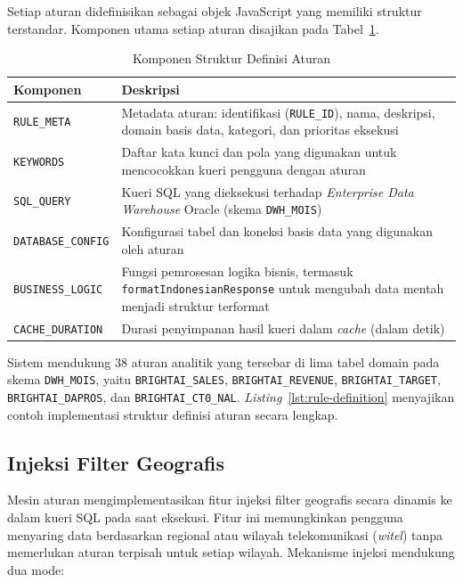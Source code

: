Setiap aturan didefinisikan sebagai objek JavaScript yang memiliki struktur terstandar. Komponen utama setiap aturan disajikan pada Tabel~\ref{tab:struktur-rule}.

\begin{table}[htbp]
\centering
\caption{Komponen Struktur Definisi Aturan}
\label{tab:struktur-rule}
\begin{tabular}{|p{3.5cm}|p{9cm}|}
\hline
\textbf{Komponen} & \textbf{Deskripsi} \\
\hline
\texttt{RULE\_META} & Metadata aturan: identifikasi (\texttt{RULE\_ID}), nama, deskripsi, domain basis data, kategori, dan prioritas eksekusi \\
\hline
\texttt{KEYWORDS} & Daftar kata kunci dan pola yang digunakan untuk mencocokkan kueri pengguna dengan aturan \\
\hline
\texttt{SQL\_QUERY} & Kueri SQL yang dieksekusi terhadap \textit{Enterprise Data Warehouse} Oracle (skema \texttt{DWH\_MOIS}) \\
\hline
\texttt{DATABASE\_CONFIG} & Konfigurasi tabel dan koneksi basis data yang digunakan oleh aturan \\
\hline
\texttt{BUSINESS\_LOGIC} & Fungsi pemrosesan logika bisnis, termasuk \texttt{formatIndonesianResponse} untuk mengubah data mentah menjadi struktur terformat \\
\hline
\texttt{CACHE\_DURATION} & Durasi penyimpanan hasil kueri dalam \textit{cache} (dalam detik) \\
\hline
\end{tabular}
\end{table}

Sistem mendukung 38 aturan analitik yang tersebar di lima tabel domain pada skema \texttt{DWH\_MOIS}, yaitu \texttt{BRIGHTAI\_}\allowbreak\texttt{SALES}, \allowbreak\texttt{BRIGHTAI\_}\allowbreak\texttt{REVENUE}, \allowbreak\texttt{BRIGHTAI\_}\allowbreak\texttt{TARGET}, \allowbreak\texttt{BRIGHTAI\_}\allowbreak\texttt{DAPROS}, dan \allowbreak\texttt{BRIGHTAI\_}\allowbreak\texttt{CT0\_}\allowbreak\texttt{NAL}. \textit{Listing}~\ref{lst:rule-definition} menyajikan contoh implementasi struktur definisi aturan secara lengkap.



\subsection{Injeksi Filter Geografis}

Mesin aturan mengimplementasikan fitur injeksi filter geografis secara dinamis ke dalam kueri SQL pada saat eksekusi. Fitur ini memungkinkan pengguna menyaring data berdasarkan regional atau wilayah telekomunikasi (\textit{witel}) tanpa memerlukan aturan terpisah untuk setiap wilayah. Mekanisme injeksi mendukung dua mode:

